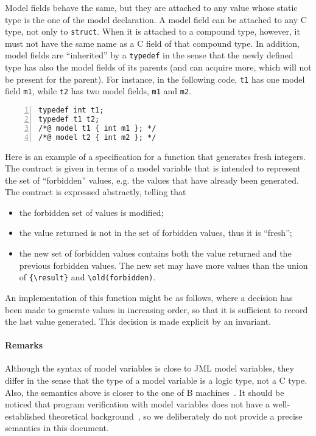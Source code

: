 Model fields behave the same, but they are attached to any value whose static
type is the one of the model declaration. A model field can be attached to any
C type, not only to \texttt{struct}. When it is attached to a compound type,
however, it must not have the same name as a C field of that compound type.
In addition, model fields are ``inherited'' by a \texttt{typedef} 
in the sense that the newly defined type has also the model fields of its
parents (and can acquire more, which will not be present for the parent).
For instance, in the following code, \texttt{t1} has one model field
\texttt{m1}, while \texttt{t2} has two model fields,
\texttt{m1} and \texttt{m2}.
\begin{lstlisting}[style=c,basicstyle=\lp@basic,numbers=left]
typedef int t1;
typedef t1 t2;
/*@ model t1 { int m1 }; */
/*@ model t2 { int m2 }; */
\end{lstlisting}

\begin{example}\label{ex:model}
  Here is an example of a specification for a function that generates
  fresh integers. The contract is given in terms of a model variable
  that is intended to represent the set of ``forbidden'' values,
  e.g. the values that have already been generated.
  The contract is expressed abstractly, telling that
  \begin{itemize}
  \item the forbidden set of values is modified;
  \item the value returned is not in the set of forbidden values, thus
    it is ``fresh'';
  \item the new set of forbidden values contains both the value
    returned and the previous forbidden values.
    The new set may have more values than the union of \lstinline|{\result}| 
    and \lstinline|\old(forbidden)|.
  \end{itemize}
  An implementation of this function might be as follows, where a
  decision has been made to generate values in increasing order, so
  that it is sufficient to record the last value generated. This decision
  is made explicit by an invariant.
\end{example}

\paragraph{Remarks}

Although the syntax of model variables is close to JML model
variables, they differ in the sense that the type of a model variable
is a logic type, not a C type. Also, the semantics above is closer to
the one of B machines~\cite{abrial96:_b_book}. It should be noticed
that program verification with model variables does not have a
well-established theoretical background~\cite{marche07,leavens07}, so
we deliberately do not provide a precise semantics in this document.

